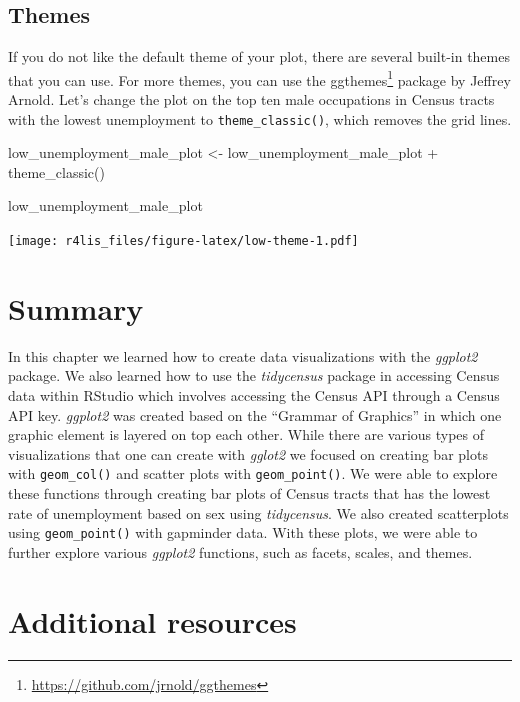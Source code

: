 \documentclass[
  krantz2]{krantz}
\makeatletter
\newenvironment{Shaded}{\begin{snugshade}}{\end{snugshade}}
\newcommand{\FunctionTok}[1]{\textcolor[rgb]{0,0,0}{#1}}
\newcommand{\NormalTok}[1]{#1}
\newcommand{\OtherTok}[1]{\textcolor[rgb]{0.37,0.37,0.37}{#1}}
\newcommand{\SpecialCharTok}[1]{\textcolor[rgb]{0,0,0}{#1}}
\newenvironment{kframe}{%
\medskip{}
\setlength{\fboxsep}{.8em}
 \def\at@end@of@kframe{}%
 \ifinner\ifhmode%
  \def\at@end@of@kframe{\end{minipage}}%
  \begin{minipage}{\columnwidth}%
 \fi\fi%
 \def\FrameCommand##1{\hskip\@totalleftmargin \hskip-\fboxsep
 \colorbox{shadecolor}{##1}\hskip-\fboxsep
     \hskip-\linewidth \hskip-\@totalleftmargin \hskip\columnwidth}%
 \MakeFramed {\advance\hsize-\width
   \@totalleftmargin\z@ \linewidth\hsize
   \@setminipage}}%
 {\par\unskip\endMakeFramed%
 \at@end@of@kframe}
\renewenvironment{Shaded}{\begin{kframe}}{\end{kframe}}
\makeatother
\begin{document}
\hypertarget{themes}{%
\subsection{Themes}\label{themes}}

If you do not like the default theme of your plot, there are several built-in themes that you can use. For more themes, you can use the ggthemes\footnote{\url{https://github.com/jrnold/ggthemes}} package by Jeffrey Arnold. Let's change the plot on the top ten male occupations in Census tracts with the lowest unemployment to \texttt{theme\_classic()}, which removes the grid lines.

\begin{Shaded}
\begin{Highlighting}[]
\NormalTok{low\_unemployment\_male\_plot }\OtherTok{\textless{}{-}}\NormalTok{ low\_unemployment\_male\_plot }\SpecialCharTok{+}
  \FunctionTok{theme\_classic}\NormalTok{()}

\NormalTok{low\_unemployment\_male\_plot}
\end{Highlighting}
\end{Shaded}

\texttt{[image: r4lis\_files/figure-latex/low-theme-1.pdf]}

\hypertarget{ggplot2-summary}{%
\section{Summary}\label{ggplot2-summary}}

In this chapter we learned how to create data visualizations with the \emph{ggplot2} package. We also learned how to use the \emph{tidycensus} package in accessing Census data within RStudio which involves accessing the Census API through a Census API key. \emph{ggplot2} was created based on the ``Grammar of Graphics'' in which one graphic element is layered on top each other. While there are various types of visualizations that one can create with \emph{gglot2} we focused on creating bar plots with \texttt{geom\_col()} and scatter plots with \texttt{geom\_point()}. We were able to explore these functions through creating bar plots of Census tracts that has the lowest rate of unemployment based on sex using \emph{tidycensus}. We also created scatterplots using \texttt{geom\_point()} with gapminder data. With these plots, we were able to further explore various \emph{ggplot2} functions, such as facets, scales, and themes.

\hypertarget{ggplot2-resources}{%
\section{Additional resources}\label{ggplot2-resources}}
\end{document}
